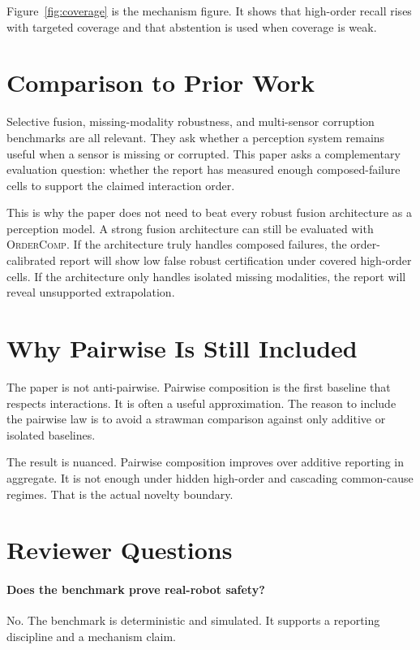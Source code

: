 \documentclass{article}
\newcommand{\method}{\textsc{OrderComp}}
\begin{document}
Figure~\ref{fig:coverage} is the mechanism figure. It shows that high-order recall rises with targeted coverage and that abstention is used when coverage is weak.

\section{Comparison to Prior Work}

Selective fusion, missing-modality robustness, and multi-sensor corruption benchmarks are all relevant. They ask whether a perception system remains useful when a sensor is missing or corrupted. This paper asks a complementary evaluation question: whether the report has measured enough composed-failure cells to support the claimed interaction order.

This is why the paper does not need to beat every robust fusion architecture as a perception model. A strong fusion architecture can still be evaluated with \method. If the architecture truly handles composed failures, the order-calibrated report will show low false robust certification under covered high-order cells. If the architecture only handles isolated missing modalities, the report will reveal unsupported extrapolation.

\section{Why Pairwise Is Still Included}

The paper is not anti-pairwise. Pairwise composition is the first baseline that respects interactions. It is often a useful approximation. The reason to include the pairwise law is to avoid a strawman comparison against only additive or isolated baselines.

The result is nuanced. Pairwise composition improves over additive reporting in aggregate. It is not enough under hidden high-order and cascading common-cause regimes. That is the actual novelty boundary.

\section{Reviewer Questions}

\paragraph{Does the benchmark prove real-robot safety?}
No. The benchmark is deterministic and simulated. It supports a reporting discipline and a mechanism claim.
\end{document}
